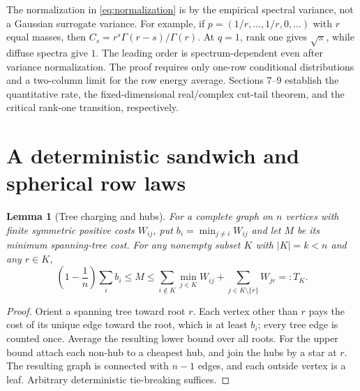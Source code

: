 \documentclass[11pt]{article}
\newtheorem{lemma}[theorem]{Lemma}
\begin{document}
The normalization in \eqref{eq:normalization} is by the empirical spectral variance, not a Gaussian surrogate variance. For example, if $p=(1/r,\ldots,1/r,0,\ldots)$ with $r$ equal masses, then $C_s=r^s\Gamma(r-s)/\Gamma(r)$. At $q=1$, rank one gives $\sqrt\pi$, while diffuse spectra give $1$. The leading order is spectrum-dependent even after variance normalization. The proof requires only one-row conditional distributions and a two-column limit for the row energy average. Sections 7--9 establish the quantitative rate, the fixed-dimensional real/complex cut-tail theorem, and the critical rank-one transition, respectively.

\section{A deterministic sandwich and spherical row laws}
\begin{lemma}[Tree charging and hubs]\label{lem:tree}
For a complete graph on $n$ vertices with finite symmetric positive costs $W_{ij}$, put $b_i=\min_{j\ne i}W_{ij}$ and let $M$ be its minimum spanning-tree cost. For any nonempty subset $K$ with $|K|=k<n$ and any $r\in K$,
\begin{equation}
\left(1-\frac1n\right)\sum_i b_i\le M\le
\sum_{i\notin K}\min_{j\in K}W_{ij}+\sum_{j\in K\setminus\{r\}}W_{jr}=:T_K.
\label{eq:tree}
\end{equation}
\end{lemma}
\begin{proof}
Orient a spanning tree toward root $r$. Each vertex other than $r$ pays the cost of its unique edge toward the root, which is at least $b_i$; every tree edge is counted once. Average the resulting lower bound over all roots. For the upper bound attach each non-hub to a cheapest hub, and join the hubs by a star at $r$. The resulting graph is connected with $n-1$ edges, and each outside vertex is a leaf. Arbitrary deterministic tie-breaking suffices.
\end{proof}
\end{document}
